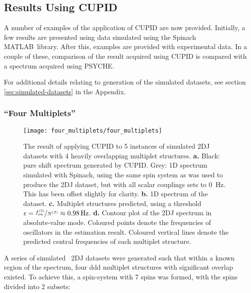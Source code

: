 \subsection{Results Using \acs{CUPID}}
\label{subsec:cupid-results}
A number of examples of the application of \ac{CUPID} are now provided.
Initially, a few results are presented using data simulated using the Spinach
MATLAB\textregistered\ library\cite{Hogben2011}.
After this, examples are provided with experimental data. In a couple of these,
comparison of the result acquired using \ac{CUPID} is compared with a spectrum
acquired using \ac{PSYCHE}.

For additional details relating to generation of the simulated datasets, see
section \ref{sec:simulated-datasets} in the Appendix.

\subsubsection{``Four Multiplets''}
\begin{figure}
    \centering
    \texttt{[image: four\_multiplets/four\_multiplets]}
    \caption[
        The result of applying \acs{CUPID} to 5 instances of simulated
        \acs{2DJ} datasets with 4 heavily overlapping multiplet structures.
    ]{
        The result of applying \ac{CUPID} to 5 instances of simulated \ac{2DJ}
        datasets with 4 heavily overlapping multiplet structures.
        \textbf{a.} Black: pure shift spectrum generated by \ac{CUPID}.
        Grey: \ac{1D} spectrum simulated with Spinach, using the same spin
        system as was used to produce the \ac{2DJ} dataset, but with all scalar
        couplings sets to \qty{0}{\hertz}. This has been offset slightly for
        clarity.
        \textbf{b.} \ac{1D} spectrum of the dataset.
        \textbf{c.} Multiplet structures predicted, using a threshold $\epsilon
        = \nicefrac{f_{\mathrm{sw}}^{(2)}}{N^{(2)}} \approx \qty{0.98}{\hertz}$.
        \textbf{d.} Contour plot of the \ac{2DJ} spectrum in absolute-value
        mode. Coloured points denote the frequencies of oscillators in the
        estimation result.
        Coloured vertical lines denote the predicted central frequencies of
        each multiplet structure.
    }
    \label{fig:four-multiplets}
\end{figure}
A series of simulated \proton\ \ac{2DJ} datasets were generated such that
within a known region of the spectrum, four ddd multiplet structures with
significant overlap existed. To achieve this, a spin-system with 7 spins was
formed, with the spins divided into 2 subsets:
